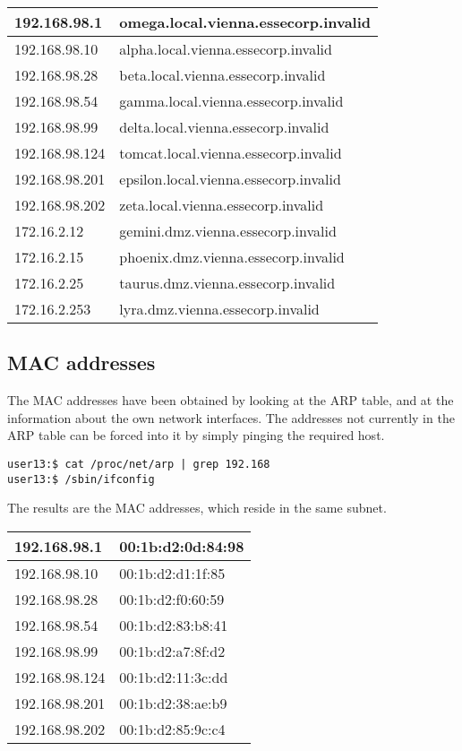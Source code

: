 \documentclass[12pt,a4paper,titlepage,oneside]{scrartcl}
\begin{document}
\begin{tabular}{| l | l |}
\hline
192.168.98.1 & omega.local.vienna.essecorp.invalid \\ \hline
192.168.98.10 & alpha.local.vienna.essecorp.invalid \\ \hline
192.168.98.28 & beta.local.vienna.essecorp.invalid \\ \hline
192.168.98.54 & gamma.local.vienna.essecorp.invalid \\ \hline
192.168.98.99 & delta.local.vienna.essecorp.invalid \\ \hline
192.168.98.124 & tomcat.local.vienna.essecorp.invalid \\ \hline
192.168.98.201 & epsilon.local.vienna.essecorp.invalid \\ \hline
192.168.98.202 & zeta.local.vienna.essecorp.invalid \\ \hline
172.16.2.12 & gemini.dmz.vienna.essecorp.invalid \\ \hline
172.16.2.15 & phoenix.dmz.vienna.essecorp.invalid \\ \hline
172.16.2.25 & taurus.dmz.vienna.essecorp.invalid \\ \hline
172.16.2.253 & lyra.dmz.vienna.essecorp.invalid \\ \hline
\end{tabular}

\subsection{MAC addresses}

The MAC addresses have been obtained by looking at the ARP table, and at the information about the own network interfaces. The addresses not currently in the ARP table can be forced into it by simply pinging the required host.

\begin{lstlisting}[style=simple]
user13:$ cat /proc/net/arp | grep 192.168
user13:$ /sbin/ifconfig
\end{lstlisting}

The results are the MAC addresses, which reside in the same subnet.

\begin{tabular}{| l | l |}
\hline
192.168.98.1 & 00:1b:d2:0d:84:98 \\ \hline
192.168.98.10 & 00:1b:d2:d1:1f:85 \\ \hline
192.168.98.28 & 00:1b:d2:f0:60:59 \\ \hline
192.168.98.54 & 00:1b:d2:83:b8:41 \\ \hline
192.168.98.99 & 00:1b:d2:a7:8f:d2 \\ \hline
192.168.98.124 & 00:1b:d2:11:3c:dd \\ \hline
192.168.98.201 & 00:1b:d2:38:ae:b9 \\ \hline
192.168.98.202 & 00:1b:d2:85:9c:c4 \\ \hline
\end{tabular}
\end{document}
